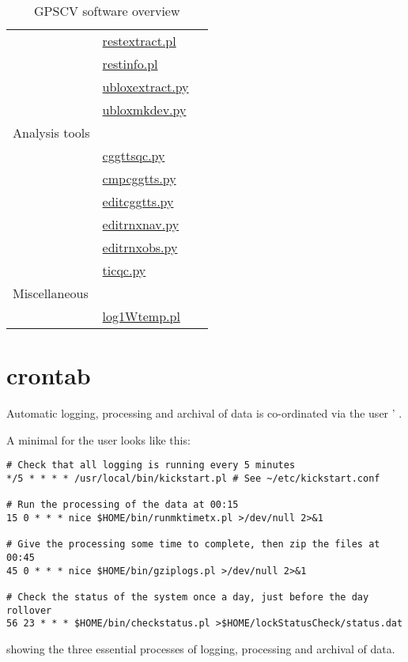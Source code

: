 \begin{table}
\begin{tabular}{l|l|l}
	& \hyperlink{h:restextract}{restextract.pl} & \\
	& \hyperlink{h:restinfo}{restinfo.pl} & \\
	& \hyperlink{h:ubloxextract}{ubloxextract.py} & \\
	& \hyperlink{h:ubloxmkdev}{ubloxmkdev.py} & \\
	\hline
Analysis tools & & \\
	& \hyperlink{h:cggttsqc}{cggttsqc.py} & \\
	& \hyperlink{h:cmpcggtts}{cmpcggtts.py} & \\
	& \hyperlink{h:editcggtts}{editcggtts.py} & \\
	& \hyperlink{h:editrnxnav}{editrnxnav.py} & \\
	& \hyperlink{h:editrnxobs}{editrnxobs.py} & \\
	& \hyperlink{h:ticqc}{ticqc.py} & \\
Miscellaneous & & \\
  & \hyperlink{h:log1Wtemp}{log1Wtemp.pl} & \\ 
	\hline
\end{tabular}
\caption{GPSCV software overview \label{t:OTTPSoftware} }
\end{table}

\section{crontab \label{ss:crontab}}

Automatic logging, processing and archival of data is co-ordinated via the user ' .

A minimal  for the user  looks like this:
\begin{lstlisting}
# Check that all logging is running every 5 minutes
*/5 * * * * /usr/local/bin/kickstart.pl # See ~/etc/kickstart.conf

# Run the processing of the data at 00:15
15 0 * * * nice $HOME/bin/runmktimetx.pl >/dev/null 2>&1 

# Give the processing some time to complete, then zip the files at 00:45
45 0 * * * nice $HOME/bin/gziplogs.pl >/dev/null 2>&1

# Check the status of the system once a day, just before the day rollover
56 23 * * * $HOME/bin/checkstatus.pl >$HOME/lockStatusCheck/status.dat
\end{lstlisting}
showing the three essential processes of logging, processing and archival of data.

